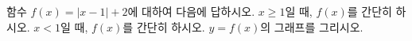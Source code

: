 함수 $f(x)=|x-1|+2$에 대하여 다음에 답하시오.
 $x\ge 1$일 때, $f(x)$를 간단히 하시오.
 $x<1$일 때, $f(x)$를 간단히 하시오.
 $y=f(x)$의 그래프를 그리시오.
